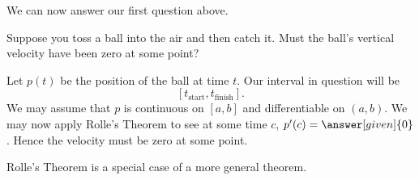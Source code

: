 \documentclass{ximera}
\begin{document}
We can now answer our first question above.

\begin{example}
Suppose you toss a ball into the air and then catch it. Must the
ball's vertical velocity have been zero at some point?
\begin{explanation}
  Let $p(t)$ be the position of the ball at time $t$. Our interval in question will be
  \[
  [t_\mathrm{start},t_\mathrm{finish}].
  \]
  We may assume that $p$ is continuous on $[a,b]$ and differentiable
  on $(a,b)$. We may now apply Rolle's Theorem to see at some time
  $c$, $p'(c)=\answer[given]{0}$. Hence the velocity must be zero at
  some point.
\end{explanation}
\end{example}

Rolle's Theorem is a special case of a more general theorem.
\end{document}
